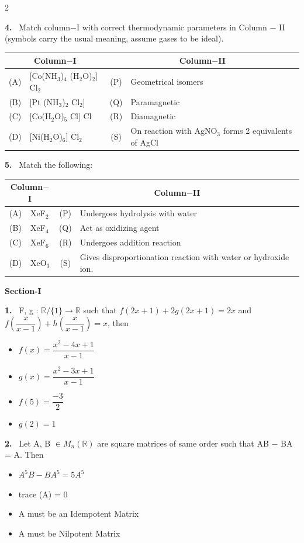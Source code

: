 \documentclass[10pt]{extarticle}
\newcommand{\partsec}[2]{\par\medskip\noindent{\large\bfseries PART-#1: #2}\par\smallskip}
\newcommand{\sect}[1]{\par\smallskip\noindent\textbf{#1}\par}
\newcommand{\qn}[1]{\par\smallskip\noindent\textbf{#1.}~}
\newenvironment{qoptions}{\begin{itemize}[leftmargin=1.8em,itemsep=1pt,topsep=2pt,label={}]}{\end{itemize}}
\newcommand{\opt}[2]{\item[(#1)] #2}
\begin{document}
\begin{multicols}{2}
\qn{4} Match column$-$I with correct thermodynamic parameters in Column $-$ II (symbols carry the usual meaning, assume gases to be ideal).\par\nobreak
\begin{center}\small\setlength{\tabcolsep}{3pt}
\begin{tabular}{|c|p{3.2cm}|c|p{2.8cm}|}
\hline
\multicolumn{2}{|c|}{Column$-$I} & \multicolumn{2}{c|}{Column$-$II} \\
\hline
(A) & [Co(NH$_3$)$_4$ (H$_2$O)$_2$] Cl$_2$ & (P) & Geometrical isomers \\
\hline
(B) & [Pt (NH$_3$)$_2$ Cl$_2$] & (Q) & Paramagnetic \\
\hline
(C) & [Co(H$_2$O)$_5$ Cl] Cl & (R) & Diamagnetic \\
\hline
(D) & [Ni(H$_2$O)$_6$] Cl$_2$ & (S) & On reaction with AgNO$_3$ forms 2 equivalents of AgCl \\
\hline
\end{tabular}
\end{center}

\qn{5} Match the following:\par\nobreak
\begin{center}\small\setlength{\tabcolsep}{3pt}
\begin{tabular}{|c|p{1.5cm}|c|p{4.6cm}|}
\hline
\multicolumn{2}{|c|}{Column$-$I} & \multicolumn{2}{c|}{Column$-$II} \\
\hline
(A) & XeF$_2$ & (P) & Undergoes hydrolysis with water \\
\hline
(B) & XeF$_4$ & (Q) & Act as oxidizing agent \\
\hline
(C) & XeF$_6$ & (R) & Undergoes addition reaction \\
\hline
(D) & XeO$_3$ & (S) & Gives disproportionation reaction with water or hydroxide ion. \\
\hline
\end{tabular}
\end{center}

\partsec{3}{MATHEMATICS}
\sect{Section-I}

\qn{1} F, g : $\mathbb R/\{1\}\to\mathbb R$ such that $f(2x+1)+2g(2x+1)=2x$ and $f\left(\dfrac{x}{x-1}\right)+h\left(\dfrac{x}{x-1}\right)=x$, then
\begin{qoptions}
\opt{A}{$f(x)=\dfrac{x^2-4x+1}{x-1}$}
\opt{B}{$g(x)=\dfrac{x^2-3x+1}{x-1}$}
\opt{C}{$f(5)=\dfrac{-3}{2}$}
\opt{D}{$g(2)=1$}
\end{qoptions}

\qn{2} Let A, B $\in M_n(\mathbb R)$ are square matrices of same order such that AB $-$ BA = A. Then
\begin{qoptions}
\opt{A}{$A^5B-BA^5=5A^5$}
\opt{B}{trace (A) = 0}
\opt{C}{A must be an Idempotent Matrix}
\opt{D}{A must be Nilpotent Matrix}
\end{qoptions}


\end{multicols}
\end{document}
